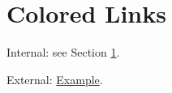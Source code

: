 \documentclass{article}
\begin{document}
\section{Colored Links}\label{sec:color}
Internal: see Section \ref{sec:color}.

External: \href{https://example.com}{Example}.
\end{document}
